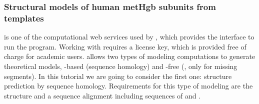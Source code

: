\subsubsection*{Structural models of human metHgb subunits from templates}

 \modeller \citep{sali1993} is one of the computational web services used by \chimera, which provides the interface to run the program. Working with \modeller requires a license key, which is provided free of charge for academic users. \modeller allows two types of modeling computations to generate theoretical models, -based (sequence homology) and -free (, only for missing segments). In this tutorial we are going to consider the first one: structure prediction by sequence homology. Requirements for this type of modeling are the  structure and a sequence alignment including sequences of  and . 
 
